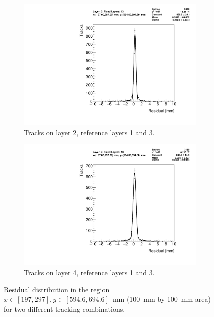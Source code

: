 \begin{figure}
\centering
\begin{subfigure}{.5\textwidth}
  \centering
  \includegraphics[width=\linewidth]{figures/figure_res_dist_QL2P11_3100V_2021-08-05_xbin_12_ybin_7_layer2_fixedlayers13.pdf}
  \caption{Tracks on layer 2, reference layers 1 and 3.}
  \label{fig:res_dist_L2_F13}
\end{subfigure}
\begin{subfigure}{.5\textwidth}
  \centering
  \includegraphics[width=\linewidth]{figures/figure_res_dist_QL2P11_3100V_2021-08-05_xbin_12_ybin_7_layer4_fixedlayers13.pdf}
  \caption{Tracks on layer 4, reference layers 1 and 3.}
  \label{fig:res_dist_L4_F13}
\end{subfigure}
\caption{Residual distribution in the region $x\in\left[197, 297\right],  y\in\left[594.6, 694.6\right]$~mm (\SI{100}{mm} by \SI{100}{mm} area) for two different tracking combinations. }
\label{fig:res_dist}
\end{figure}

